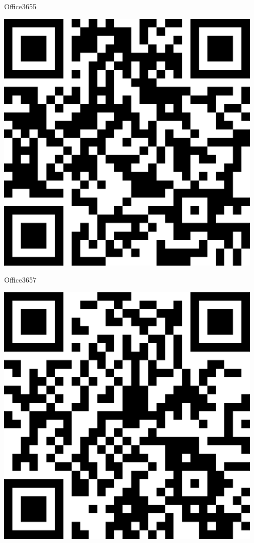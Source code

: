 \documentclass[letterpaper]{article}
\begin{document}
 \hfill{\small Office3655} 

 \vspace{1in} 
 \pagebreak 
{} 
 \vspace*{\fill} 
 \begingroup 
 \centerline{\includegraphics[scale=1,width=5in,height=5in]{Office3657.png}} 
 \endgroup 
 \vspace*{\fill} 

 \hfill{\small Office3657} 

 \vspace{1in} 
 \pagebreak 
{} 
 \vspace*{\fill} 
 \begingroup 
 \centerline{\includegraphics[scale=1,width=5in,height=5in]{Office3659.png}} 
 \endgroup 
 \vspace*{\fill} 
\end{document}
